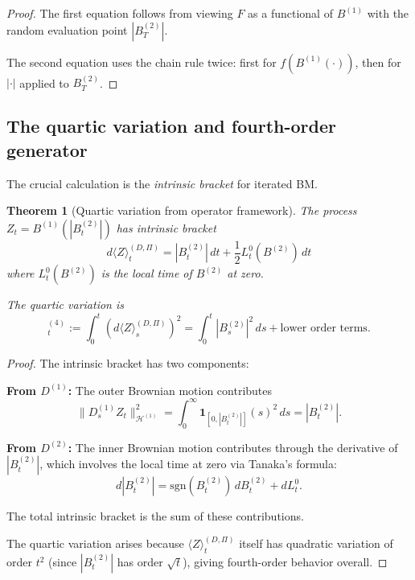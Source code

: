 \documentclass[11pt]{article}
\newtheorem{theorem}{Theorem}[section]
\theoremstyle{definition}
\newcommand{\Hi}{\mathcal{H}}
\begin{document}
\begin{proof}
The first equation follows from viewing $F$ as a functional of $B^{(1)}$ with the random evaluation point $|B^{(2)}_T|$.

The second equation uses the chain rule twice: first for $f(B^{(1)}(\cdot))$, then for $|\cdot|$ applied to $B^{(2)}_T$.
\end{proof}

\subsection{The quartic variation and fourth-order generator}

The crucial calculation is the \emph{intrinsic bracket} for iterated BM.

\begin{theorem}[Quartic variation from operator framework]\label{thm:quartic}
The process $Z_t = B^{(1)}(|B^{(2)}_t|)$ has intrinsic bracket
\begin{equation}
d\langle Z \rangle^{(D,\Pi)}_t = |B^{(2)}_t| \, dt + \frac{1}{2}L^0_t(B^{(2)}) \, dt
\end{equation}
where $L^0_t(B^{(2)})$ is the local time of $B^{(2)}$ at zero.

The quartic variation is
\begin{equation}
[Z]^{(4)}_t := \int_0^t (d\langle Z \rangle^{(D,\Pi)}_s)^2 = \int_0^t |B^{(2)}_s|^2 \, ds + \text{lower order terms}.
\end{equation}
\end{theorem}

\begin{proof}
The intrinsic bracket has two components:

\textbf{From $D^{(1)}$:} The outer Brownian motion contributes
\begin{equation}
\|D^{(1)}_s Z_t\|^2_{\Hi^{(1)}} = \int_0^\infty \mathbf{1}_{[0,|B^{(2)}_t|]}(s)^2 \, ds = |B^{(2)}_t|.
\end{equation}

\textbf{From $D^{(2)}$:} The inner Brownian motion contributes through the derivative of $|B^{(2)}_t|$, which involves the local time at zero via Tanaka's formula:
\begin{equation}
d|B^{(2)}_t| = \mathrm{sgn}(B^{(2)}_t) \, dB^{(2)}_t + dL^0_t.
\end{equation}

The total intrinsic bracket is the sum of these contributions.

The quartic variation arises because $\langle Z \rangle^{(D,\Pi)}_t$ itself has quadratic variation of order $t^2$ (since $|B^{(2)}_t|$ has order $\sqrt{t}$), giving fourth-order behavior overall.
\end{proof}
\end{document}
